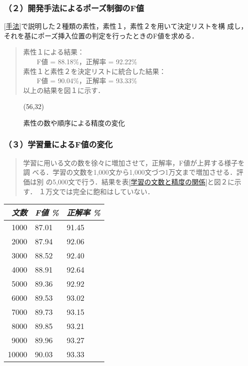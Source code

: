 \subsubsection{（２）開発手法によるポーズ制御のF値}
\ref{手法}で説明した２種類の素性，素性１，素性２を用いて決定リストを構
成し，それを基にポーズ挿入位置の判定を行ったときのF値を求める．
\begin{quote}
   素性１による結果：\\
   　　F値 = 88.18\%，正解率 = 92.22\%\\
   素性１と素性２を決定リストに統合した結果：\\
   　　F値 = 90.04\%，正解率 = 93.33\%\\
   以上の結果を図１に示す．
\end{quote}

\begin{figure}[t]
  \begin{center}
	\atari(56,32)
    \vspace{-3mm}
    \caption{素性の数や順序による精度の変化}
    \vspace{-5mm}
  \end{center}
\end{figure}


\subsubsection{（３）学習量によるF値の変化}
\begin{quote}
   学習に用いる文の数を徐々に増加させて，正解率，F値が上昇する様子を調
   べる．学習の文数を1,000文から1,000文づつ1万文まで増加させる．評価は別
   の5,000文で行う．結果を表\ref{学習の文数と精度の関係}と図２に示す．
   １万文では完全に飽和はしていない．
\end{quote}

\begin{table*}
\caption{学習の文数と精度の関係}
\label{学習の文数と精度の関係}
\begin{center}
\begin{tabular}{rll} \hline
	{\it 文数} &	{\it F値 \%} &	{\it 正解率 \%} \\ \hline
    1000   & 87.01		& 91.45 \\
    2000	& 87.94		& 92.06 \\
    3000	& 88.52		& 92.40 \\
    4000	& 88.91		& 92.64 \\
    5000	& 89.36		& 92.92 \\
    6000	& 89.53		& 93.02 \\
    7000	& 89.73		& 93.15 \\
    8000	& 89.85		& 93.21 \\
    9000	& 89.96		& 93.27 \\
   10000	& 90.03		& 93.33 \\ \hline
\end{tabular}
\end{center}
\end{table*}

